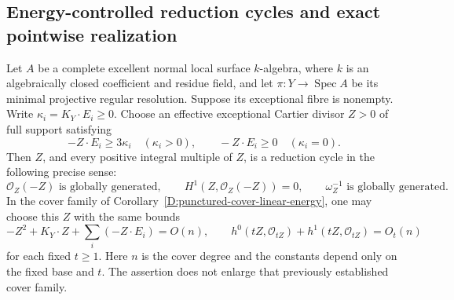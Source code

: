 \subsection{Energy-controlled reduction cycles and exact pointwise realization}

\begin{proposition}
\label{D:energy-controlled-reduction-cycle}
Let $A$ be a complete excellent normal local surface $k$-algebra,
where $k$ is an algebraically closed coefficient and residue field,
and let $\pi:Y\to\operatorname{Spec}A$ be its minimal projective
regular resolution. Suppose its exceptional fibre is nonempty.
Write $\kappa_i=K_Y\cdot E_i\ge0$.
Choose an effective exceptional Cartier divisor $Z>0$ of full
support satisfying
\[
 -Z\cdot E_i\ge3\kappa_i\quad(\kappa_i>0),\qquad
 -Z\cdot E_i\ge0\quad(\kappa_i=0).
                                                        \tag{D.KR.1}
\]
Then $Z$, and every positive integral multiple of $Z$, is a
reduction cycle in the following precise sense:
\[
 \mathcal O_Z(-Z)\text{ is globally generated},\qquad
 H^1(Z,\mathcal O_Z(-Z))=0,\qquad
 \omega_Z^{-1}\text{ is globally generated}.
                                                        \tag{D.KR.2}
\]
In the cover family of Corollary~\ref{D:punctured-cover-linear-energy},
one may choose this $Z$ with the same bounds
\[
 -Z^2+K_Y\cdot Z+\sum_i(-Z\cdot E_i)=O(n),\qquad
 h^0(tZ,\mathcal O_{tZ})+h^1(tZ,\mathcal O_{tZ})=O_t(n)
                                                        \tag{D.KR.3}
\]
for each fixed $t\ge1$. Here $n$ is the cover degree and the
constants depend only on the fixed base and $t$. The assertion
does not enlarge that previously established cover family.
\end{proposition}

